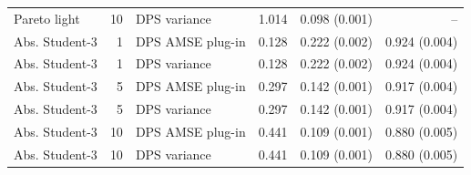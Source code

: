 \begin{tabular}{lrlrrr}
Pareto light & 10 & DPS variance & 1.014 & 0.098 (0.001) & -- \\
Abs. Student-3 & 1 & DPS AMSE plug-in & 0.128 & 0.222 (0.002) & 0.924 (0.004) \\
Abs. Student-3 & 1 & DPS variance & 0.128 & 0.222 (0.002) & 0.924 (0.004) \\
Abs. Student-3 & 5 & DPS AMSE plug-in & 0.297 & 0.142 (0.001) & 0.917 (0.004) \\
Abs. Student-3 & 5 & DPS variance & 0.297 & 0.142 (0.001) & 0.917 (0.004) \\
Abs. Student-3 & 10 & DPS AMSE plug-in & 0.441 & 0.109 (0.001) & 0.880 (0.005) \\
Abs. Student-3 & 10 & DPS variance & 0.441 & 0.109 (0.001) & 0.880 (0.005) \\
\bottomrule
\end{tabular}
